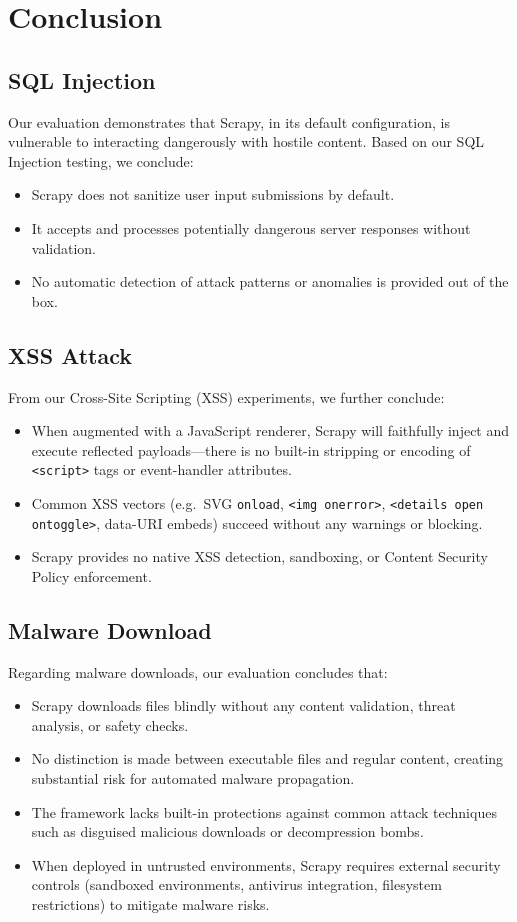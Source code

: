 \section{Conclusion}
\subsection{SQL Injection}
Our evaluation demonstrates that Scrapy, in its default configuration, is vulnerable to interacting dangerously with hostile content.  Based on our SQL Injection testing, we conclude:
\begin{itemize}
    \item Scrapy does not sanitize user input submissions by default.
    \item It accepts and processes potentially dangerous server responses without validation.
    \item No automatic detection of attack patterns or anomalies is provided out of the box.
  \end{itemize}

\subsection{XSS Attack}
From our Cross-Site Scripting (XSS) experiments, we further conclude:

\begin{itemize}
  \item When augmented with a JavaScript renderer, Scrapy will faithfully inject and execute reflected payloads—there is no built-in stripping or encoding of \texttt{<script>} tags or event-handler attributes.
  \item Common XSS vectors (e.g.\ SVG \texttt{onload}, \texttt{<img onerror>}, \texttt{<details open ontoggle>}, data-URI embeds) succeed without any warnings or blocking.
  \item Scrapy provides no native XSS detection, sandboxing, or Content Security Policy enforcement.
\end{itemize}


\subsection{Malware Download}
Regarding malware downloads, our evaluation concludes that:

\begin{itemize}
  \item Scrapy downloads files blindly without any content validation, threat analysis, or safety checks.
  \item No distinction is made between executable files and regular content, creating substantial risk for automated malware propagation.
  \item The framework lacks built-in protections against common attack techniques such as disguised malicious downloads or decompression bombs.
  \item When deployed in untrusted environments, Scrapy requires external security controls (sandboxed environments, antivirus integration, filesystem restrictions) to mitigate malware risks.
\end{itemize}

